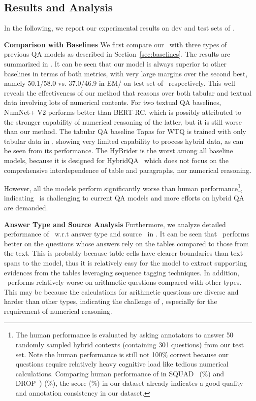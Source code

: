 \subsection{Results and Analysis}

In the following, we report our experimental results on dev and test sets of \finqa.

\noindent \textbf{Comparison with Baselines}
We first compare our \tagop~with three types of previous QA models as described in Section~\ref{sec:baselines}.
The results are summarized in .
It can be seen that our model is always superior to other baselines in terms of both metrics, with very large margins over the second best, namely  50.1/58.0 vs. 37.0/46.9 in EM/\fone{} on test set of \finqa~respectively.
This well reveals the effectiveness of our method that reasons over both tabular and textual data involving lots of numerical contents. 
For two textual QA baselines, NumNet+ V2 performs better than BERT-RC, which is possibly attributed to the stronger capability of numerical reasoning of the latter, but it is still worse than our method.
The tabular QA baseline Tapas for WTQ is trained with only tabular data in \finqa, showing very limited capability to process hybrid data, as can be seen from its performance.
The HyBrider is the worst among all baseline models, because it is designed for HybridQA~\citep{chen2020hybridqa} which does not focus on the comprehensive interdependence of table and paragraphs, nor  numerical reasoning.


However, all the models perform significantly worse than human performance\footnote{The human performance is evaluated by asking annotators to answer 50 randomly sampled hybrid contexts (containing 301 questions) from our test set. 
Note the human performance is still not 100\% correct because our questions require relatively heavy cognitive load like tedious numerical calculations. Comparing human performance of \fone{} in SQUAD~\citep{Rajpurkar2016SQuAD} (\%) and DROP~\citep{Dua2019DROP}) (\%), the score (\%) in our dataset already indicates a good quality and annotation consistency in our dataset.}, indicating \finqa~is challenging to current QA models and more efforts on hybrid QA are demanded.

\noindent \textbf{Answer Type and Source Analysis}
Furthermore, we analyze detailed performance of \tagop~w.r.t answer type and source ~in .
It can be seen that \tagop~performs better on the questions whose answers rely on the tables compared to those from the text.
This is probably because table cells have clearer boundaries than text spans to the model, thus it is relatively easy for the model to extract supporting evidences from the tables leveraging sequence tagging techniques.
In addition, \tagop~performs relatively worse on arithmetic questions compared with other types.
This may be because the calculations for arithmetic questions are diverse and harder than other types, indicating the challenge of \finqa, especially for the requirement of numerical reasoning.



